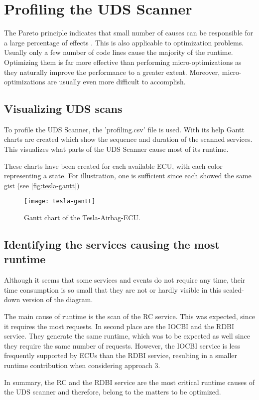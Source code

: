 \section{Profiling the UDS Scanner}

The Pareto principle indicates that small number of causes can be responsible for a large percentage of effects \cite{pareto}. This is also applicable to optimization problems. Usually only a few number of code lines cause the majority of the runtime. Optimizing them is far more effective than performing micro-optimizations as they naturally improve the performance to a greater extent. Moreover, micro-optimizations are usually even more difficult to accomplish.

\subsection{Visualizing UDS scans}

To profile the UDS Scanner, the 'profiling.csv' file is used. With its help Gantt charts are created which show the sequence and duration of the scanned services. This visualizes what parts of the UDS Scanner cause most of its runtime.

These charts have been created for each available ECU, with each color representing a state. For illustration, one is sufficient since each showed the same gist (see \autoref{fig:tesla-gantt})

\begin{figure}[H]
    \centering
    \texttt{[image: tesla-gantt]}
    \caption{Gantt chart of the Tesla-Airbag-ECU.}
    \label{fig:tesla-gantt}
\end{figure}


\subsection{Identifying the services causing the most runtime}

Although it seems that some services and events do not require any time, their time consumption is so small that they are not or hardly visible in this scaled-down version of the diagram.

The main cause of runtime is the scan of the RC service. This was expected, since it requires the most requests.
In second place are the IOCBI and the RDBI service. They generate the same runtime, which was to be expected as well since they require the same number of requests. However, the IOCBI service is less frequently supported by ECUs than the RDBI service, resulting in a smaller runtime contribution when considering approach 3.

In summary, the RC and the RDBI service are the most critical runtime causes of the UDS scanner and therefore, belong to the matters to be optimized.

